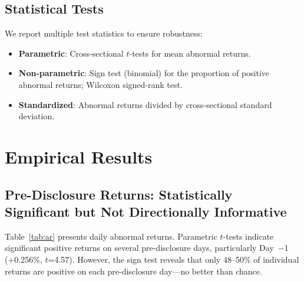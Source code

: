 \documentclass[review,authoryear]{elsarticle}
\begin{document}
\subsection{Statistical Tests}

We report multiple test statistics to ensure robustness:
\begin{itemize}
\item \textbf{Parametric}: Cross-sectional $t$-tests for mean abnormal returns.
\item \textbf{Non-parametric}: Sign test (binomial) for the proportion of positive abnormal returns; Wilcoxon signed-rank test.
\item \textbf{Standardized}: Abnormal returns divided by cross-sectional standard deviation.
\end{itemize}

\section{Empirical Results}
\label{sec:results}

\subsection{Pre-Disclosure Returns: Statistically Significant but Not Directionally Informative}

Table~\ref{tab:ar} presents daily abnormal returns. Parametric $t$-tests indicate significant positive returns on several pre-disclosure days, particularly Day~$-$1 (+0.256\%, $t$=4.57). However, the sign test reveals that only 48--50\% of individual returns are positive on each pre-disclosure day---no better than chance.
\end{document}
